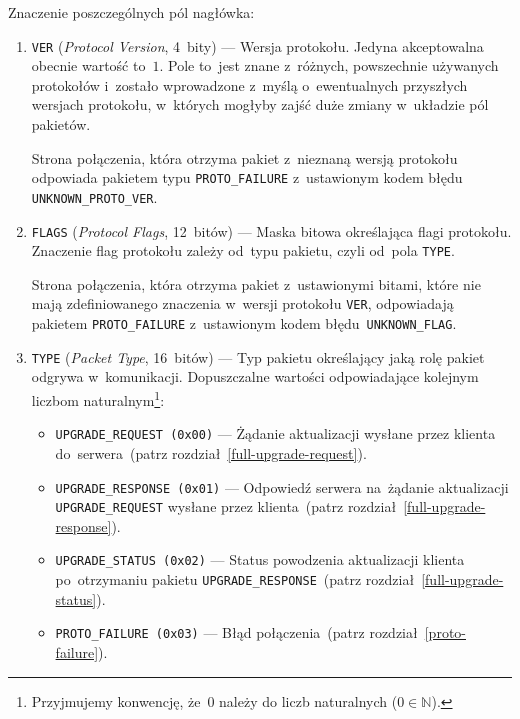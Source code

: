 \documentclass[thesis]{subfiles}
\begin{document}
Znaczenie poszczególnych pól nagłówka:\mynobreakpar
\begin{enumerate}
	\item \texttt{VER} (\emph{Protocol Version}, 4~bity) --- Wersja protokołu. Jedyna akceptowalna obecnie wartość to~$1$. Pole to~jest znane z~różnych, powszechnie używanych protokołów i~zostało wprowadzone z~myślą o~ewentualnych przyszłych wersjach protokołu, w~których mogłyby zajść duże zmiany w~układzie pól pakietów.

	Strona połączenia, która otrzyma pakiet z~nieznaną wersją protokołu odpowiada pakietem typu \texttt{PROTO\_FAILURE} z~ustawionym kodem błędu \texttt{UNKNOWN\_PROTO\_VER}.

	\item \texttt{FLAGS} (\emph{Protocol Flags}, 12~bitów) --- Maska bitowa określająca flagi protokołu. Znaczenie flag protokołu zależy od~typu pakietu, czyli od~pola \texttt{TYPE}.

	Strona połączenia, która otrzyma pakiet z~ustawionymi bitami, które nie mają zdefiniowanego znaczenia w~wersji protokołu \texttt{VER}, odpowiadają pakietem \texttt{PROTO\_FAILURE} z~ustawionym kodem błędu~\texttt{UNKNOWN\_FLAG}.

	\item \texttt{TYPE} (\emph{Packet Type}, 16~bitów) --- Typ pakietu określający jaką rolę pakiet odgrywa w~komunikacji. Dopuszczalne wartości odpowiadające kolejnym liczbom naturalnym\footnote{Przyjmujemy konwencję, że~$0$ należy do liczb naturalnych ($0\in\mathbb{N}$).}:
	\begin{itemize}
		\item \texttt{UPGRADE\_REQUEST (0x00)} --- Żądanie aktualizacji wysłane przez klienta do~serwera~(patrz rozdział~\ref{full-upgrade-request}).
		\item \texttt{UPGRADE\_RESPONSE (0x01)} --- Odpowiedź serwera na~żądanie aktualizacji \texttt{UPGRADE\_REQUEST} wysłane przez klienta~(patrz rozdział~\ref{full-upgrade-response}).
		\item \texttt{UPGRADE\_STATUS (0x02)} --- Status powodzenia aktualizacji klienta po~otrzymaniu pakietu \texttt{UPGRADE\_RESPONSE}~(patrz rozdział~\ref{full-upgrade-status}).
		\item \texttt{PROTO\_FAILURE (0x03)} --- Błąd połączenia~(patrz rozdział~\ref{proto-failure}).
	\end{itemize}


\end{enumerate}
\end{document}
